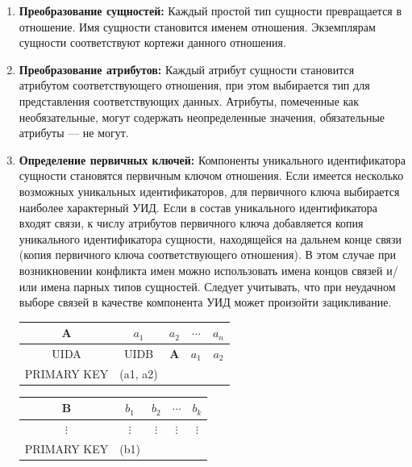 \documentclass[a4paper,12pt]{article}
\begin{document}
\begin{enumerate}
    \item \textbf{Преобразование сущностей:} Каждый простой тип сущности превращается в отношение. Имя сущности становится именем отношения. Экземплярам сущности соответствуют кортежи данного отношения.
    
    \item \textbf{Преобразование атрибутов:} Каждый атрибут сущности становится атрибутом соответствующего отношения, при этом выбирается тип для представления соответствующих данных. Атрибуты, помеченные как необязательные, могут содержать неопределенные значения, обязательные атрибуты — не могут.
    
    \item \textbf{Определение первичных ключей:} Компоненты уникального идентификатора сущности становятся первичным ключом отношения. Если имеется несколько возможных уникальных идентификаторов, для первичного ключа выбирается наиболее характерный УИД. Если в состав уникального идентификатора входят связи, к числу атрибутов первичного ключа добавляется копия уникального идентификатора сущности, находящейся на дальнем конце связи (копия первичного ключа соответствующего отношения). В этом случае при возникновении конфликта имен можно использовать имена концов связей и/или имена парных типов сущностей. Следует учитывать, что при неудачном выборе связей в качестве компонента УИД может произойти зацикливание.
    
    \begin{center}
        \begin{tabular}{|c|c|c|c|c|}
            \hline
            \textbf{A} & $a_1$ & $a_2$ & $\cdots$ & $a_n$ \\
            \hline
            UIDA & UIDB & \textbf{A} & $a_1$ & $a_2$ \\
            \hline
            PRIMARY KEY & (a1, a2) &  &  &  \\
            \hline
        \end{tabular}
        
        \quad
        
        \begin{tabular}{|c|c|c|c|c|}
            \hline
            \textbf{B} & $b_1$ & $b_2$ & $\cdots$ & $b_k$ \\
            \hline
            $\vdots$ & $\vdots$ & $\vdots$ & $\vdots$ & $\vdots$ \\
            \hline
            PRIMARY KEY & (b1) &  &  &  \\
            \hline
        \end{tabular}
        

\end{center}
\end{enumerate}
\end{document}
